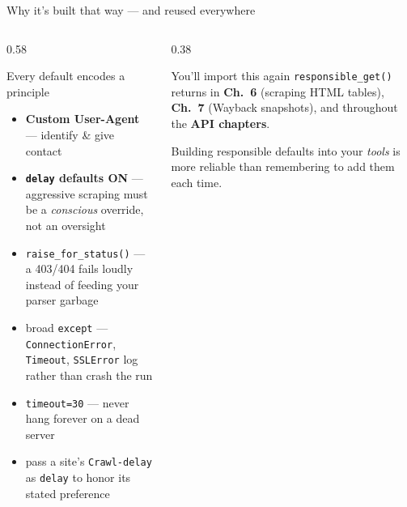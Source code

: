 \documentclass[9pt,aspectratio=169]{beamer}
\begin{document}
\begin{frame}{Why it's built that way --- and reused everywhere}
    \begin{columns}[T]
        \begin{column}{0.58\textwidth}
            \begin{block}{Every default encodes a principle}
                \begin{itemize}\small
                    \item \textbf{Custom User-Agent} --- identify \& give contact
                    \item \textbf{\texttt{delay} defaults ON} --- aggressive scraping must be a \textit{conscious} override, not an oversight
                    \item \texttt{raise\_for\_status()} --- a 403/404 fails loudly instead of feeding your parser garbage
                    \item broad \texttt{except} --- \texttt{ConnectionError}, \texttt{Timeout}, \texttt{SSLError} log rather than crash the run
                    \item \texttt{timeout=30} --- never hang forever on a dead server
                    \item pass a site's \texttt{Crawl-delay} as \texttt{delay} to honor its stated preference
                \end{itemize}
            \end{block}
        \end{column}
        \begin{column}{0.38\textwidth}
            \begin{alertblock}{You'll import this again}
                \footnotesize \texttt{responsible\_get()} returns in \textbf{Ch.~6} (scraping HTML tables), \textbf{Ch.~7} (Wayback snapshots), and throughout the \textbf{API chapters}.

                \vspace{0.5em}

                Building responsible defaults into your \textit{tools} is more reliable than remembering to add them each time.
            \end{alertblock}
        \end{column}
    \end{columns}
\end{frame}
\end{document}
